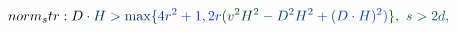 \documentclass[12pt]{article}
\begin{document}
\begin{displaymath}
{norm_str:
D} \mathcolor[RGB]{0,45,75}{\cdot} \mathcolor[RGB]{0,45,90}{H} \mathcolor[RGB]{0,45,105}{>} \mathcolor[RGB]{0,45,120}{\max} \mathcolor[RGB]{0,45,135}{\{} \mathcolor[RGB]{0,45,150}{4} \mathcolor[RGB]{0,45,165}{r} ^ { \mathcolor[RGB]{0,45,180}{2} } \mathcolor[RGB]{0,45,195}{+} \mathcolor[RGB]{0,45,210}{1} \mathcolor[RGB]{0,45,225}{,} \mathcolor[RGB]{0,45,240}{2} \mathcolor[RGB]{0,45,255}{r} \mathcolor[RGB]{0,60,0}{(} \mathcolor[RGB]{0,60,15}{v} ^ { \mathcolor[RGB]{0,60,30}{2} } \mathcolor[RGB]{0,60,45}{H} ^ { \mathcolor[RGB]{0,60,60}{2} } \mathcolor[RGB]{0,60,75}{-} \mathcolor[RGB]{0,60,90}{D} ^ { \mathcolor[RGB]{0,60,105}{2} } \mathcolor[RGB]{0,60,120}{H} ^ { \mathcolor[RGB]{0,60,135}{2} } \mathcolor[RGB]{0,60,150}{+} \mathcolor[RGB]{0,60,165}{(} \mathcolor[RGB]{0,60,180}{D} \mathcolor[RGB]{0,60,195}{\cdot} \mathcolor[RGB]{0,60,210}{H} \mathcolor[RGB]{0,60,225}{)} ^ { \mathcolor[RGB]{0,60,240}{2} } \mathcolor[RGB]{0,60,255}{)} \mathcolor[RGB]{0,75,0}{\}} \mathcolor[RGB]{0,75,15}{,} \mathcolor[RGB]{0,75,30}{\nobreakspace} \mathcolor[RGB]{0,75,45}{s} \mathcolor[RGB]{0,75,60}{>} \mathcolor[RGB]{0,75,75}{2} \mathcolor[RGB]{0,75,90}{d} \mathcolor[RGB]{0,75,105}{,}
\end{displaymath}
\end{document}
